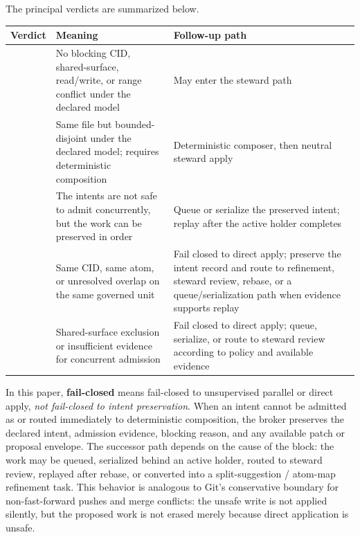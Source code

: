 \documentclass[9pt,letterpaper]{extarticle}
\newcommand{\TableFont}{\fontsize{8.2}{9.4}\selectfont}
\newcommand{\TableLead}[1]{\par\smallskip\noindent{\raggedright\small\bfseries #1\par}\smallskip}
\begin{document}
The principal verdicts are summarized below.

\begin{table}[!b]
\TableLead{Table 4 --- Broker Verdicts and Follow-Up Paths.}
\centering
\TableFont
\setlength{\tabcolsep}{3pt}
\begin{tabular}{@{}L{0.22\textwidth}L{0.25\textwidth}L{0.47\textwidth}@{}}
\toprule
Verdict & Meaning & Follow-up path \\
\midrule
\texttt{} & No blocking CID, shared-surface, read/write, or range conflict under the declared model & May enter the steward path \\
\texttt{} & Same file but bounded-disjoint under the declared model; requires deterministic composition & Deterministic composer, then neutral steward apply \\
\texttt{} & The intents are not safe to admit concurrently, but the work can be preserved in order & Queue or serialize the preserved intent; replay after the active holder completes \\
\texttt{} & Same CID, same atom, or unresolved overlap on the same governed unit & Fail closed to direct apply; preserve the intent record and route to refinement, steward review, rebase, or a queue/serialization path when evidence supports replay \\
\texttt{} & Shared-surface exclusion or insufficient evidence for concurrent admission & Fail closed to direct apply; queue, serialize, or route to steward review according to policy and available evidence \\
\bottomrule
\end{tabular}
\end{table}

In this paper, \textbf{fail-closed} means fail-closed to unsupervised parallel or direct apply, \emph{not fail-closed to intent preservation}. When an intent cannot be admitted as \texttt{} or routed immediately to deterministic composition, the broker preserves the declared intent, admission evidence, blocking reason, and any available patch or proposal envelope. The successor path depends on the cause of the block: the work may be queued, serialized behind an active holder, routed to steward review, replayed after rebase, or converted into a split-suggestion / atom-map refinement task. This behavior is analogous to Git's conservative boundary for non-fast-forward pushes and merge conflicts: the unsafe write is not applied silently, but the proposed work is not erased merely because direct application is unsafe.
\end{document}
